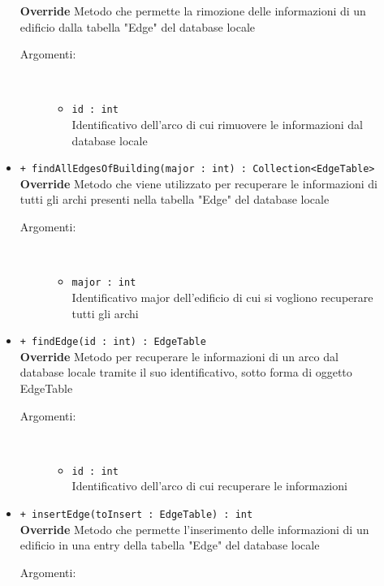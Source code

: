 \documentclass[../DefinizioneDiProdotto.tex]{subfiles}
\begin{document}
\begin{description}
\begin{itemize}
		\textbf{Override} Metodo che permette la rimozione delle informazioni di un edificio dalla tabella "Edge" del database locale 
		\begin{description}
			\item[Argomenti:] \
			\begin{itemize}
				\item \texttt{id : int}\\
				Identificativo dell'arco di cui rimuovere le informazioni dal database locale\end{itemize}
		\end{description}
		\item \texttt{+ findAllEdgesOfBuilding(major : int) : Collection<EdgeTable>}\\
		\textbf{Override} Metodo che viene utilizzato per recuperare le informazioni di tutti gli archi presenti nella tabella "Edge" del database locale
		\begin{description}
			\item[Argomenti:] \
			\begin{itemize}
				\item \texttt{major : int}\\
				Identificativo major dell'edificio di cui si vogliono recuperare tutti gli archi\end{itemize}
		\end{description}
		\item \texttt{+ findEdge(id : int) : EdgeTable}\\
		\textbf{Override} Metodo per recuperare le informazioni di un arco dal database locale tramite il suo identificativo, sotto forma di oggetto EdgeTable
		\begin{description}
			\item[Argomenti:] \
			\begin{itemize}
				\item \texttt{id : int}\\
				Identificativo dell'arco di cui recuperare le informazioni\end{itemize}
		\end{description}
		\item \texttt{+ insertEdge(toInsert : EdgeTable) : int}\\
		\textbf{Override} Metodo che permette l'inserimento delle informazioni di un edificio in una entry della tabella "Edge" del database locale
		\begin{description}
			\item[Argomenti:] \
			\begin{itemize}

\end{itemize}
\end{description}
\end{itemize}
\end{description}
\end{document}
